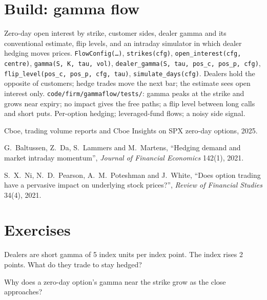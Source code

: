 \section{Build: gamma flow}\label{bld:s2:zero-day-options-and-dealer-gamma-flows:gammaflow}

\begin{build}
 Zero-day open interest by strike, customer sides, dealer gamma and its conventional estimate, flip levels, and an intraday
simulator in which dealer hedging moves prices.
 \texttt{FlowConfig(\dots)}, \texttt{strikes(cfg)}, \texttt{open\_interest(cfg, centre)}, \texttt{gamma(S, K, tau, vol)},
\texttt{dealer\_gamma(S, tau, pos\_c, pos\_p, cfg)}, \texttt{flip\_level(pos\_c, pos\_p, cfg, tau)}, \texttt{simulate\_days(cfg)}.
 Dealers hold the opposite of customers; hedge trades move the next bar; the estimate sees open interest only.
 \texttt{code/firm/gammaflow/tests/}: gamma peaks at the strike and grows near expiry; no impact gives the free paths; a flip
level between long calls and short puts.
 Per-option hedging; leveraged-fund flows; a noisy side signal.
\end{build}

\begin{omsources}
\item Cboe, trading volume reports and Cboe Insights on SPX zero-day options, 2025.
\item G.~Baltussen, Z.~Da, S.~Lammers and M.~Martens, ``Hedging demand and market intraday momentum'', \emph{Journal of Financial Economics}
142(1), 2021.
\item S.~X.~Ni, N.~D.~Pearson, A.~M.~Poteshman and J.~White, ``Does option trading have a pervasive impact on underlying stock prices?'',
\emph{Review of Financial Studies} 34(4), 2021.
\end{omsources}

\section{Exercises}

\begin{exercise}[$\star$]\label{exo:s2:zero-day-options-and-dealer-gamma-flows:1}
Dealers are short gamma of 5 index units per index point. The index rises 2 points. What do they trade to stay hedged?
\end{exercise}

\begin{exercise}[$\star$]\label{exo:s2:zero-day-options-and-dealer-gamma-flows:2}
Why does a zero-day option's gamma near the strike grow as the close approaches?
\end{exercise}

